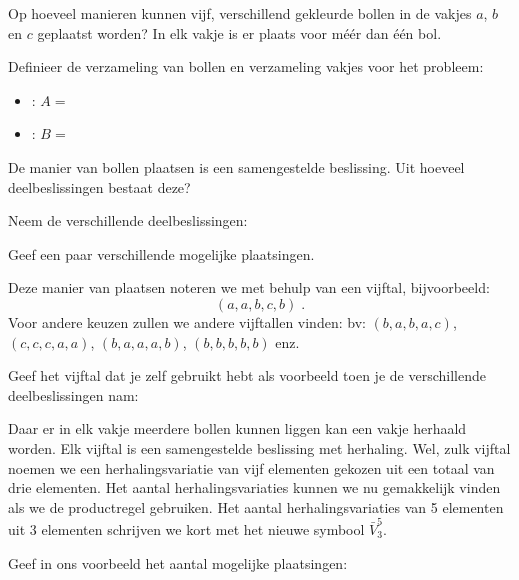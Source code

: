 \documentclass[12pt,twoside]{article}
\begin{document}
Op hoeveel manieren kunnen vijf, verschillend gekleurde bollen in de vakjes $a$, $b$ en $c$ geplaatst worden? In elk vakje is er plaats voor méér dan één bol.

\begin{oefening}
Definieer de verzameling van bollen en verzameling vakjes voor het probleem:
\begin{itemize}
  \item \arule{4cm}:  $A =$ \arulefill%
  \item \arule{4cm}: $B =$\arulefill %
\end{itemize}
\end{oefening}

\begin{oefening}
De manier van bollen plaatsen is een samengestelde beslissing. Uit hoeveel deelbeslissingen bestaat deze?
\end{oefening}

\begin{oefening}
Neem de verschillende deelbeslissingen:
\end{oefening}

\begin{oefening}
Geef een paar verschillende mogelijke plaatsingen.
\end{oefening}

Deze manier van plaatsen noteren we met behulp van een vijftal, bijvoorbeeld:
$$(a, a, b, c, b)\;.$$
Voor andere keuzen zullen we andere vijftallen vinden: bv: $(b, a, b, a, c)$, $(c, c, c, a, a)$, $(b, a, a, a,
b)$, $(b, b, b, b, b)$ enz.

\begin{oefening}
Geef het vijftal dat je zelf gebruikt hebt als voorbeeld toen je de verschillende deelbeslissingen nam:
\end{oefening}

Daar er in elk vakje meerdere bollen kunnen liggen kan een vakje herhaald worden.
Elk vijftal is een samengestelde beslissing met herhaling. Wel, zulk vijftal noemen
we een herhalingsvariatie van vijf elementen gekozen uit een totaal van drie elementen.
Het aantal herhalingsvariaties kunnen we nu gemakkelijk vinden als we de productregel gebruiken.
Het aantal herhalingsvariaties van 5 elementen uit 3 elementen schrijven we kort met het nieuwe symbool $\bar{V}^5_3$.

\begin{oefening}
Geef in ons voorbeeld het aantal mogelijke plaatsingen:
\end{oefening}
\end{document}
